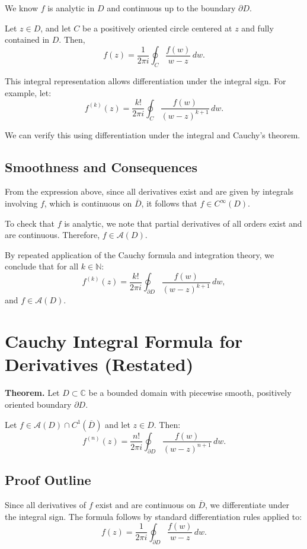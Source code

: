 \documentclass[12pt]{article}
\theoremstyle{definition} %
\theoremstyle{plain} %
\begin{document}
We know $f$ is analytic in $D$ and continuous up to the boundary $\partial D$.

Let $z \in D$, and let $C$ be a positively oriented circle centered at $z$ and fully contained in $D$. Then,
\[
f(z) = \frac{1}{2\pi i} \oint_C \frac{f(w)}{w - z}\,dw.
\]

This integral representation allows differentiation under the integral sign. For example, let:
\[
f^{(k)}(z) = \frac{k!}{2\pi i} \oint_C \frac{f(w)}{(w - z)^{k+1}}\,dw.
\]

We can verify this using differentiation under the integral and Cauchy's theorem.

\subsection*{Smoothness and Consequences}

From the expression above, since all derivatives exist and are given by integrals involving $f$, which is continuous on $\overline{D}$, it follows that $f \in C^\infty(D)$.

To check that $f$ is analytic, we note that partial derivatives of all orders exist and are continuous. Therefore, $f \in \mathcal{A}(D)$.

By repeated application of the Cauchy formula and integration theory, we conclude that for all $k \in \mathbb{N}$:
\[
f^{(k)}(z) = \frac{k!}{2\pi i} \oint_{\partial D} \frac{f(w)}{(w - z)^{k+1}}\,dw,
\]
and $f \in \mathcal{A}(D)$.

\section*{Cauchy Integral Formula for Derivatives (Restated)}

\textbf{Theorem.} Let $D \subset \mathbb{C}$ be a bounded domain with piecewise smooth, positively oriented boundary $\partial D$.

Let $f \in \mathcal{A}(D) \cap C^1(\overline{D})$ and let $z \in D$. Then:
\[
f^{(n)}(z) = \frac{n!}{2\pi i} \oint_{\partial D} \frac{f(w)}{(w - z)^{n+1}}\,dw.
\]

\subsection*{Proof Outline}

Since all derivatives of $f$ exist and are continuous on $\overline{D}$, we differentiate under the integral sign. The formula follows by standard differentiation rules applied to:
\[
f(z) = \frac{1}{2\pi i} \oint_{\partial D} \frac{f(w)}{w - z}\,dw.
\]
\end{document}
